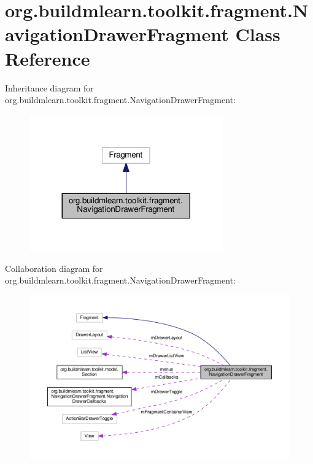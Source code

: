 \hypertarget{classorg_1_1buildmlearn_1_1toolkit_1_1fragment_1_1NavigationDrawerFragment}{}\section{org.\+buildmlearn.\+toolkit.\+fragment.\+Navigation\+Drawer\+Fragment Class Reference}
\label{classorg_1_1buildmlearn_1_1toolkit_1_1fragment_1_1NavigationDrawerFragment}


Inheritance diagram for org.\+buildmlearn.\+toolkit.\+fragment.\+Navigation\+Drawer\+Fragment\+:
\nopagebreak
\begin{figure}[H]
\begin{center}
\leavevmode
\includegraphics[width=236pt]{classorg_1_1buildmlearn_1_1toolkit_1_1fragment_1_1NavigationDrawerFragment__inherit__graph}
\end{center}
\end{figure}


Collaboration diagram for org.\+buildmlearn.\+toolkit.\+fragment.\+Navigation\+Drawer\+Fragment\+:
\nopagebreak
\begin{figure}[H]
\begin{center}
\leavevmode
\includegraphics[width=350pt]{classorg_1_1buildmlearn_1_1toolkit_1_1fragment_1_1NavigationDrawerFragment__coll__graph}
\end{center}
\end{figure}
